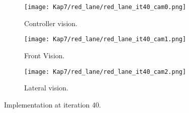 
\begin{figure}
\centering
\begin{subfigure}[t]{\textwidth}
    \texttt{[image: Kap7/red\_lane/red\_lane\_it40\_cam0.png]}
    \caption{Controller vision.}
    \label{fig:first}
\end{subfigure}
\vspace{1cm}
\begin{subfigure}[b]{0.4\textwidth}
    \texttt{[image: Kap7/red\_lane/red\_lane\_it40\_cam1.png]}
    \caption{Front Vision.}
    \label{fig:second}
\end{subfigure}
\hfill
\begin{subfigure}[b]{0.50\textwidth}
    \texttt{[image: Kap7/red\_lane/red\_lane\_it40\_cam2.png]}
    \caption{Lateral vision.}
    \label{fig:third}
\end{subfigure}
\caption{Implementation at iteration 40.}
\label{fig:figures}
\end{figure}